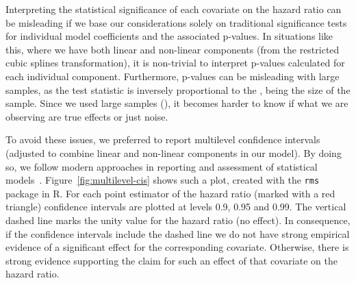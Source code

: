 \documentclass{chi2012}
\begin{document}
Interpreting the statistical significance of each covariate on the hazard ratio can be misleading if we base our considerations solely on traditional significance tests for individual model coefficients and the associated p-values. In situations like this, where
we have both linear and non-linear components (from the restricted cubic splines transformation), it is non-trivial to interpret p-values calculated for each individual component. Furthermore, p-values can be misleading with large samples, as the test statistic is inversely proportional to the , being  the size of the sample. Since we used large samples (), it becomes harder to know if what we are observing are true effects or just noise.

To avoid these issues, we preferred to report multilevel confidence intervals (adjusted to combine linear and non-linear components in our model). By doing so, we follow modern approaches in reporting and assessment of statistical models~\cite{cumming2013}.
Figure~\ref{fig:multilevel-cis} shows such a plot, created with the \texttt{rms}
package in R. For each point estimator of the hazard ratio (marked with a red
triangle) confidence intervals are plotted at levels 0.9, 0.95 and 0.99. The
vertical dashed line marks the unity value for the hazard ratio (no effect).
In consequence, if the confidence intervals include the dashed line we do not
have strong empirical evidence of a significant effect for the corresponding
covariate. Otherwise, there is strong evidence supporting the claim for such
an effect of that covariate on the hazard ratio.

\begin{figure*}
\vspace{-1cm}
\centering
{}
\hspace{0mm}
\hspace{0mm}
\hspace{0mm}
\caption{Estimated hazard ratios and multilevel confidence intervals at 90\% (dark blue),
95\% (blue) and 99\% (light blue) for model covariates in each site. 
Hazard ratios are calculated between the lower and upper 
limits of the interquartile range (continuous variables) or comparing between 
levels (categorical variables), as indicated next to the label of each covariate.}
\label{fig:multilevel-cis}
\end{figure*}
\end{document}
